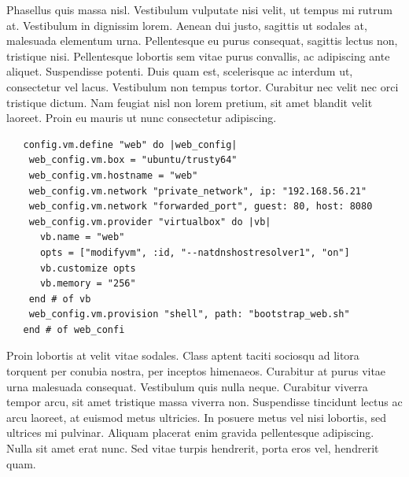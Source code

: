 \documentclass[a4paper,12pt]{texMemo}
\begin{document}
Phasellus quis massa nisl. Vestibulum vulputate nisi velit, ut tempus mi rutrum at. Vestibulum in dignissim lorem. Aenean dui justo, sagittis ut sodales at, malesuada elementum urna. Pellentesque eu purus consequat, sagittis lectus non, tristique nisi. Pellentesque lobortis sem vitae purus convallis, ac adipiscing ante aliquet. Suspendisse potenti. Duis quam est, scelerisque ac interdum ut, consectetur vel lacus. Vestibulum non tempus tortor. Curabitur nec velit nec orci tristique dictum. Nam feugiat nisl non lorem pretium, sit amet blandit velit laoreet. Proin eu mauris ut nunc consectetur adipiscing.
\footnotesize
\begin{verbatim}
   config.vm.define "web" do |web_config|
    web_config.vm.box = "ubuntu/trusty64"
    web_config.vm.hostname = "web"
    web_config.vm.network "private_network", ip: "192.168.56.21"
    web_config.vm.network "forwarded_port", guest: 80, host: 8080
    web_config.vm.provider "virtualbox" do |vb|
      vb.name = "web"
      opts = ["modifyvm", :id, "--natdnshostresolver1", "on"]
      vb.customize opts
      vb.memory = "256"
    end # of vb
    web_config.vm.provision "shell", path: "bootstrap_web.sh"
   end # of web_confi
\end{verbatim}
\normalsize
Proin lobortis at velit vitae sodales. Class aptent taciti sociosqu ad litora torquent per conubia nostra, per inceptos himenaeos. Curabitur at purus vitae urna malesuada consequat. Vestibulum quis nulla neque. Curabitur viverra tempor arcu, sit amet tristique massa viverra non. Suspendisse tincidunt lectus ac arcu laoreet, at euismod metus ultricies. In posuere metus vel nisi lobortis, sed ultrices mi pulvinar. Aliquam placerat enim gravida pellentesque adipiscing. Nulla sit amet erat nunc. Sed vitae turpis hendrerit, porta eros vel, hendrerit quam.
\end{document}

